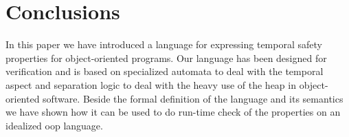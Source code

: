 \documentclass[preprint]{sigplanconf} %
\theoremstyle{definition}
\begin{document}
\section{Conclusions}\label{sec:conclusions} %
In this paper we have introduced a language for expressing temporal safety properties for object-oriented programs.
Our language has been designed for verification and is based on specialized automata to deal with the temporal aspect and separation logic to deal with the  heavy use of the heap in object-oriented software. 
Beside the formal definition of the language and its semantics we have shown how it can be used to do run-time check of the properties 
on an idealized oop language.



\softraggedright


\end{document}
